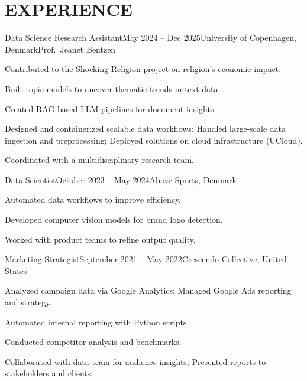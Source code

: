 \documentclass{resume}
\begin{document}
\section{EXPERIENCE}
\begin{content}

    \begin{position}{Data Science Research Assistant}{May 2024 -- Dec 2025}{University of Copenhagen, Denmark}{Prof.~Jeanet Bentzen}{}
        \item Contributed to the {\href{https://www.economics.ku.dk/research/externally-funded-research_new/shocking-religion/}{Shocking Religion}} project on religion's economic impact.
        \item Built topic models to uncover thematic trends in text data.
        \item Created RAG-based LLM pipelines for document insights.
        \item Designed and containerized scalable data workflows; Handled large-scale data ingestion and preprocessing; Deployed solutions on cloud infrastructure (UCloud).
        \item Coordinated with a multidisciplinary research team.
    \end{position}
    
    \begin{position}{Data Scientist}{October 2023 -- May 2024}{Above Sports, Denmark}{}{}
        \item Automated data workflows to improve efficiency.
        \item Developed computer vision models for brand logo detection.
        \item Worked with product teams to refine output quality.
    \end{position}
    
    \begin{position}{Marketing Strategist}{September 2021 -- May 2022}{Crescendo Collective, United States}{}{}
        \item Analyzed campaign data via Google Analytics; Managed Google Ads reporting and strategy.
        \item Automated internal reporting with Python scripts.
        \item Conducted competitor analysis and benchmarks.
        \item Collaborated with data team for audience insights; Presented reports to stakeholders and clients.
    \end{position}
    

\end{content}
\end{document}
